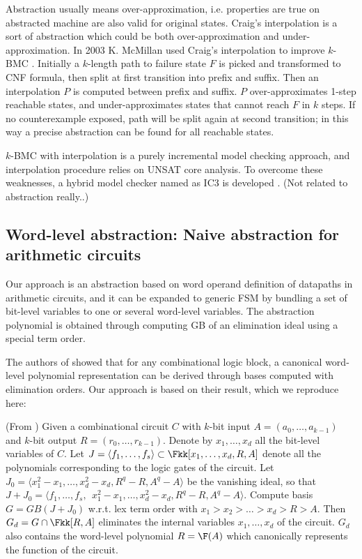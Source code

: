 Abstraction usually means over-approximation, i.e. properties are true on abstracted machine
are also valid for original states. Craig's interpolation is a sort of abstraction which could be both
over-approximation and under-approximation. In 2003 K. McMillan used Craig's interpolation to improve 
$k$-BMC \cite{mcmillan2003interpolation}. Initially a $k$-length path to failure state $F$ is picked and transformed to 
CNF formula, then split at first transition into prefix and suffix. Then an interpolation $P$ is computed
between prefix and suffix. $P$ over-approximates 1-step reachable states, and under-approximates states 
that cannot reach $F$ in $k$ steps. If no counterexample exposed, path will be split again at second
transition; in this way a precise abstraction can be found for all reachable states.

$k$-BMC with interpolation is a purely incremental model checking approach, and interpolation procedure relies
on UNSAT core analysis. To overcome these weaknesses, a hybrid model checker named as IC3 is developed 
\cite{bradley2011sat} \cite{bradley2011incremental}. (Not related to abstraction really..)
\subsection{Word-level abstraction: Naive abstraction for arithmetic circuits}
Our approach is an abstraction based on word operand definition of datapaths in arithmetic circuits,
and it can be expanded to generic FSM by bundling a set of bit-level variables to one or several word-level variables.
The abstraction polynomial is obtained through computing GB of an elimination ideal using a special term order.

The authors of \cite{pruss:dac14} showed that for any combinational
logic block, a canonical word-level polynomial representation can be
derived through \Grobner bases computed with elimination
orders. Our approach is based on their result, which we reproduce
here:
\begin{Lemma}
(From \cite{pruss:dac14}) Given a combinational circuit $C$ with $k$-bit
  input $A = (a_0, \dots, a_{k-1})$ and $k$-bit output $R = (r_0, \dots,
  r_{k-1})$. Denote by $x_1, \dots, x_d$ all the bit-level
  variables of   $C$. Let $J = \langle f_1, \dots, f_s \rangle \subset
  \Fkk[x_1, \dots, x_d, R, A]$ denote all the polynomials corresponding to the
  logic gates of the circuit. Let $J_0 = \langle x_1^2 - x_1, \dots,
  x_d^2 - x_d, R^q - R, A^q - A \rangle$ be the vanishing ideal, so
  that $J + J_0 = \langle f_1, \dots, f_s, ~~ x_1^2 - x_1, \dots,
  x_d^2 - x_d, R^q - R, A^q - A \rangle$. Compute \Grobner basis $G =
  GB(J + J_0)$ w.r.t. lex term order with $x_1 > x_2 > \dots > x_d > R
  > A$. Then $G_d = G \cap \Fkk[R, A]$ eliminates the internal
  variables $x_1, \dots, x_d$ of the circuit. $G_d$ also contains the
  word-level polynomial $R = \F(A)$ which canonically represents the
  function of the circuit.  
\end{Lemma}

